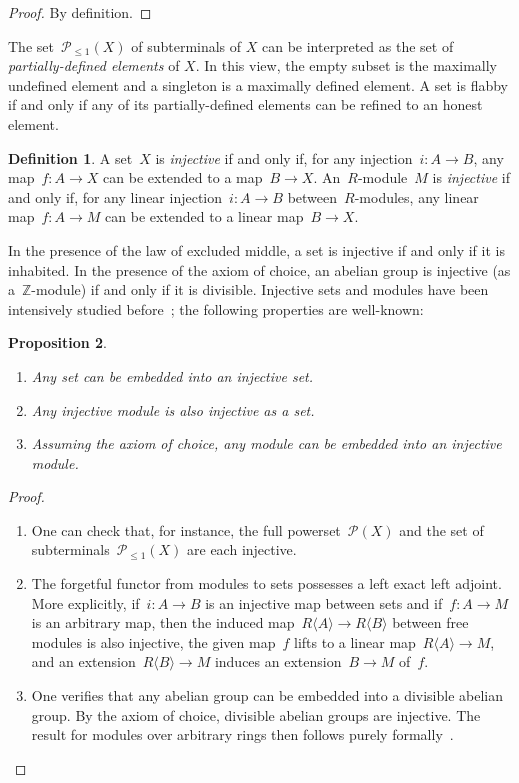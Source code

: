 \documentclass[oneside]{amsart}
\theoremstyle{definition}
\newtheorem{defn}{Definition}[section]
\theoremstyle{plain}
\newtheorem{prop}[defn]{Proposition}
\theoremstyle{remark}
\newcommand{\ZZ}{\mathbb{Z}}
\renewcommand{\P}{\mathcal{P}}
\renewcommand{\_}{\mathpunct{.}\,}
\begin{document}
\begin{proof}By definition.\end{proof}

The set~$\P_{\leq 1}(X)$ of subterminals of $X$ can be interpreted as the set
of \emph{partially-defined elements} of $X$. In this view, the empty subset is
the maximally undefined element and a singleton is a maximally defined element.
A set is flabby if and only if any of its partially-defined elements can be
refined to an honest element.

\begin{defn}A set~$X$ is \emph{injective} if and only if, for any injection~$i
: A \to B$, any map~$f : A \to X$ can be extended to a map~$B \to X$.
An~$R$-module~$M$ is \emph{injective} if and only if, for any linear
injection~$i : A \to B$ between~$R$-modules, any linear map~$f : A \to M$ can
be extended to a linear map~$B \to X$.\end{defn}

In the presence of the law of excluded middle, a set is injective if and only
if it is inhabited. In the presence of the axiom of choice, an abelian group is
injective (as a~$\ZZ$-module) if and only if it is divisible. Injective sets
and modules have been intensively studied before~\cite{XXX}; the following
properties are well-known:

\begin{prop}\label{prop:basics-injective}
\begin{enumerate}
\item Any set can be embedded into an injective set.
\item Any injective module is also injective as a set.
\item Assuming the axiom of choice, any module can be embedded into an
injective module.
\end{enumerate}\end{prop}

\begin{proof}\begin{enumerate}
\item One can check that, for instance, the full powerset~$\P(X)$ and the set of
subterminals~$\P_{\leq 1}(X)$ are each injective.~\cite{XXX}
\item The forgetful functor from modules to sets possesses a left exact left
adjoint. More explicitly, if~$i : A \to B$ is an injective map between sets and
if~$f : A \to M$ is an arbitrary map, then the induced map~$R\langle A \rangle
\to R\langle B \rangle$ between free modules is also injective, the given
map~$f$ lifts to a linear map~$R\langle A \rangle \to M$, and an
extension~$R\langle B \rangle \to M$ induces an extension~$B \to M$ of~$f$.
\item One verifies that any abelian group can be embedded into a divisible
abelian group. By the axiom of choice, divisible abelian groups are injective.
The result for modules over arbitrary rings then follows purely
formally~\cite{XXX}. \qedhere
\end{enumerate}\end{proof}
\end{document}
